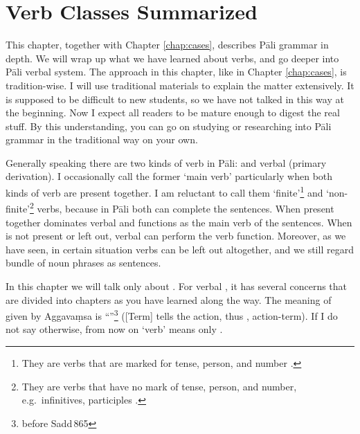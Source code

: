 \chapter{Verb Classes Summarized}\label{chap:vclass}

This chapter, together with Chapter \ref{chap:cases}, describes P\=ali grammar in depth. We will wrap up what we have learned about verbs, and go deeper into P\=ali verbal system. The approach in this chapter, like in Chapter \ref{chap:cases}, is tradition-wise. I will use traditional materials to explain the matter extensively. It is supposed to be difficult to new students, so we have not talked in this way at the beginning. Now I expect all readers to be mature enough to digest the real stuff. By this understanding, you can go on studying or researching into P\=ali grammar in the traditional way on your own.

Generally speaking there are two kinds of verb in P\=ali:  and verbal  (primary derivation). I occasionally call the former `main verb' particularly when both kinds of verb are present together. I am reluctant to call them `finite'\footnote{They are verbs that are marked for tense, person, and number \citep[p.~172]{brownmiller:dict}.} and `non-finite'\footnote{They are verbs that have no mark of tense, person, and number, e.g.\ infinitives, participles \citep[p.~312]{brownmiller:dict}.} verbs, because in P\=ali both can complete the sentences. When present together  dominates verbal  and functions as the main verb of the sentences. When  is not present or left out, verbal  can perform the verb function. Moreover, as we have seen, in certain situation verbs can be left out altogether, and we still regard bundle of noun phrases as sentences.

In this chapter we will talk only about . For verbal , it has several concerns that are divided into chapters as you have learned along the way. The meaning of  given by Aggava\d msa is ``''\footnote{before Sadd\,865} ([Term] tells the action, thus , action-term). If I do not say otherwise, from now on `verb' means only .

